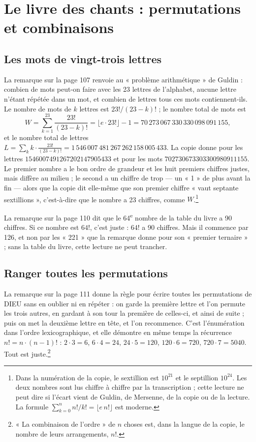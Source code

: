 \documentclass[11pt,a4paper]{article}
\begin{document}
\section*{Le livre des chants : permutations et combinaisons}

\subsection*{Les mots de vingt-trois lettres}

La remarque sur la page 107 renvoie au « problème arithmétique » de Guldin :
combien de mots peut-on faire avec les 23 lettres de l'alphabet, aucune lettre
n'étant répétée dans un mot, et combien de lettres tous ces mots contiennent-ils.
Le nombre de mots de $k$ lettres est $23!/(23-k)!$ ; le nombre total de mots est
\[
W = \sum_{k=1}^{23}\frac{23!}{(23-k)!} = \lfloor e \cdot 23! \rfloor - 1
 = 70\,273\,067\,330\,330\,098\,091\,155,
\]
et le nombre total de lettres
$L = \sum_k k\cdot\frac{23!}{(23-k)!} = 1\,546\,007\,481\,267\,262\,158\,005\,433$.
La copie donne pour les lettres $1546007491267202147905433$ et pour les mots
$702730673303300980911155$. Le premier nombre a le bon ordre de grandeur et les
huit premiers chiffres justes, mais diffère au milieu ; le second a un chiffre de
trop — un « 1 » de plus avant la fin — alors que la copie dit elle-même que son
premier chiffre « vaut septante sextillions », c'est-à-dire que le nombre a 23
chiffres, comme $W$.\footnote{Dans la numération de la copie, le sextillion est
$10^{21}$ et le septillion $10^{24}$. Les deux nombres sont lus chiffre à chiffre
par la transcription ; cette lecture ne peut dire si l'écart vient de Guldin,
de Mersenne, de la copie ou de la lecture. La formule $\sum_{k=0}^{n} n!/k! =
\lfloor e\,n! \rfloor$ est moderne.}

La remarque sur la page 110 dit que le 64\textsuperscript{e} nombre de la table du
livre a 90 chiffres. Si ce nombre est $64!$, c'est juste : $64!$ a 90 chiffres.
Mais il commence par 126, et non par les « 221 » que la remarque donne pour son
« premier ternaire » ; sans la table du livre, cette lecture ne peut trancher.

\subsection*{Ranger toutes les permutations}

La remarque sur la page 111 donne la règle pour écrire toutes les permutations
de DIEU sans en oublier ni en répéter : on garde la première lettre et l'on
permute les trois autres, en gardant à son tour la première de celles-ci, et
ainsi de suite ; puis on met la deuxième lettre en tête, et l'on recommence.
C'est l'énumération dans l'ordre lexicographique, et elle démontre en même
temps la récurrence $n! = n \cdot (n-1)!$ : $2 \cdot 3 = 6$, $6 \cdot 4 = 24$,
$24 \cdot 5 = 120$, $120 \cdot 6 = 720$, $720 \cdot 7 = 5040$. Tout est
juste.\footnote{« La combinaison de l'ordre » de $n$ choses est, dans la langue
de la copie, le nombre de leurs arrangements, $n!$.}
\end{document}
